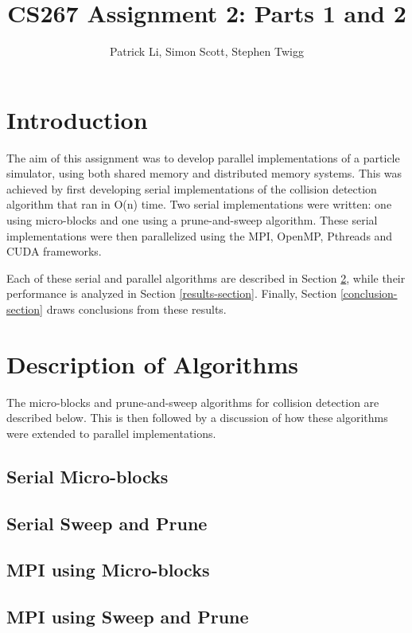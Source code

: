 \documentclass[11pt]{article} %
\title{CS267 Assignment 2: Parts 1 and 2}
\author{Patrick Li, Simon Scott, Stephen Twigg}
\begin{document}
\maketitle
\parskip 7.2pt

\section{Introduction}

The aim of this assignment was to develop parallel implementations of a particle simulator, using both shared memory and distributed memory systems. This was achieved by first developing serial implementations of the collision detection algorithm that ran in O(n) time. Two serial implementations were written: one using micro-blocks and one using a prune-and-sweep algorithm. These serial implementations were then parallelized using the MPI, OpenMP, Pthreads and CUDA frameworks.

Each of these serial and parallel algorithms are described in Section \ref{algorithm-section}, while their performance is analyzed in Section \ref{results-section}. Finally, Section \ref{conclusion-section} draws conclusions from these results.

\section{Description of Algorithms}
\label{algorithm-section}

The micro-blocks and prune-and-sweep algorithms for collision detection are described below. This is then followed by a discussion of how these algorithms were extended to parallel implementations.

\subsection{Serial Micro-blocks}

\subsection{Serial Sweep and Prune}

\subsection{MPI using Micro-blocks}

\subsection{MPI using Sweep and Prune}
\end{document}
